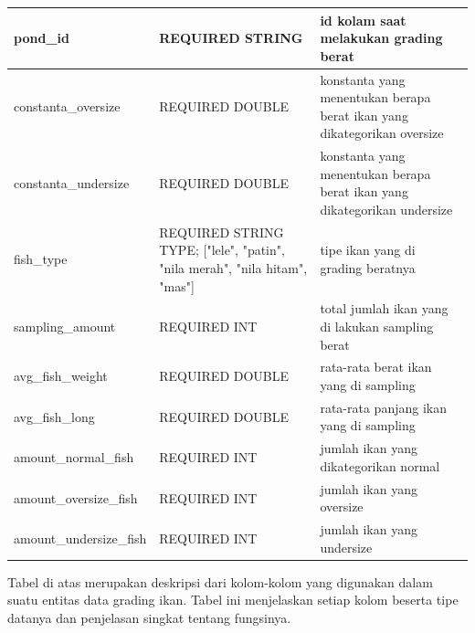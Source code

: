 \begin{enumerate}[1.]
\begin{longtable}{| l | p{5cm} | p{5cm} |}
pond\_id                & REQUIRED STRING                                                                & id kolam saat melakukan grading berat                                    \\ \hline
constanta\_oversize     & REQUIRED DOUBLE                                                                & konstanta yang menentukan berapa berat ikan yang dikategorikan oversize  \\ \hline
constanta\_undersize    & REQUIRED DOUBLE                                                                & konstanta yang menentukan berapa berat ikan yang dikategorikan undersize \\ \hline
fish\_type              & REQUIRED STRING TYPE; {[}"lele", "patin", "nila merah", "nila hitam", "mas"{]} & tipe ikan yang di grading beratnya                                       \\ \hline
sampling\_amount        & REQUIRED INT                                                                   & total jumlah ikan yang di lakukan sampling berat                         \\ \hline
avg\_fish\_weight       & REQUIRED DOUBLE                                                                & rata-rata berat ikan yang di sampling                                    \\ \hline
avg\_fish\_long         & REQUIRED DOUBLE                                                                & rata-rata panjang ikan yang di sampling                                  \\ \hline
amount\_normal\_fish    & REQUIRED INT                                                                   & jumlah ikan yang dikategorikan normal                                    \\ \hline
amount\_oversize\_fish  & REQUIRED INT                                                                   & jumlah ikan yang oversize                                                \\ \hline
amount\_undersize\_fish & REQUIRED INT                                                                   & jumlah ikan yang undersize                                               \\ \hline
\end{longtable}


Tabel di atas merupakan deskripsi dari kolom-kolom yang digunakan dalam suatu entitas data grading ikan. Tabel ini menjelaskan setiap kolom beserta tipe datanya dan penjelasan singkat tentang fungsinya.


\end{enumerate}
